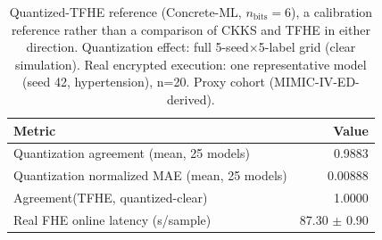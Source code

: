 \begin{table}[t]
\centering
\caption{Quantized-TFHE reference (Concrete-ML, $n_\text{bits}=6$), a calibration reference rather than a comparison of CKKS and TFHE in either direction. Quantization effect: full 5-seed$\times$5-label grid (clear simulation). Real encrypted execution: one representative model (seed 42, hypertension), n=20. Proxy cohort (MIMIC-IV-ED-derived).}
\label{tab:s2_tfhe}
\begin{tabular}{lr}
\toprule
Metric & Value \\
\midrule
Quantization agreement (mean, 25 models) & 0.9883 \\
Quantization normalized MAE (mean, 25 models) & 0.00888 \\
Agreement(TFHE, quantized-clear) & 1.0000 \\
Real FHE online latency (s/sample) & 87.30 $\pm$ 0.90 \\
\bottomrule
\end{tabular}
\end{table}
